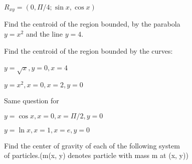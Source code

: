 \documentclass{amsbook}
\begin{document}
\begin{hEnumerateArabic}
\begin{hEnumerateAlpha}
\begin{multicols}{2}
                \item $R_{xy} = (0, \Pi /4 ; \sin{x}, \cos{x})$
                \end{multicols}
            \end{hEnumerateAlpha}
        \item 
        Find the centroid of the region bounded, by the parabola \\ $y = x^2$ and the line $y = 4$.
        \item
        Find the centroid of the region bounded by the curves:
            \begin{hEnumerateAlpha}
                \begin{multicols}{2}
                \item $y = \sqrt{x}, y = 0, x =4$ $\quad \quad$
                \columnbreak
                \item $y = x^2, x=0, x = 2, y = 0$
                \end{multicols}
            \end{hEnumerateAlpha}
        \item
        Same question for 
            \begin{hEnumerateAlpha}
            
                \item $y = \cos{x}, x = 0, x = \Pi /2, y = 0$
                
                \item $y = \ln{x}, x = 1, x = e, y = 0$
                
            \end{hEnumerateAlpha}
        \item 
        Find the center of gravity of each of the following system\\ of particles.(m(x, y) denotes particle with mass m at (x, y))
        
        
        
    \end{hEnumerateArabic}
    
 
\end{document}
